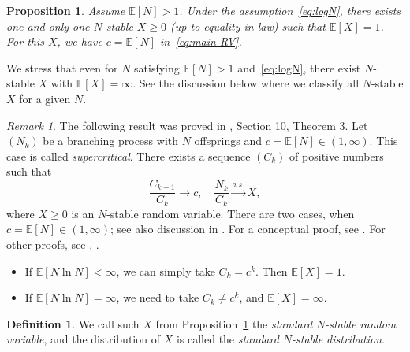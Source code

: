 \documentclass[12pt]{amsart}
\newtheorem{prop}{Proposition}[section]
\theoremstyle{remark}
\newtheorem{remark}{Remark}[section]
\theoremstyle{definition}
\newtheorem{definition}{Definition}[section]
\begin{document}
\begin{prop} 
Assume $\mathbb E[N] > 1$. Under the assumption~\eqref{eq:logN}, there exists one and only one $N$-stable $X \ge 0$ (up to equality in law) such that $\mathbb E[X] = 1$. For this $X$, we have $c = \mathbb E[N]$ in~\eqref{eq:main-RV}. 
\label{prop:n-ln-n}
\end{prop}

We stress that even for $N$ satisfying $\mathbb E[N] > 1$ and~\eqref{eq:logN}, there exist $N$-stable $X$ with $\mathbb E[X] = \infty$. See the discussion below where we classify all $N$-stable $X$ for a given $N$. 

\begin{remark}
The following result was proved in \cite[Chapter I]{AthreyaBook}, Section 10, Theorem 3. Let $(N_k)$ be a branching process with $N$ offsprings and $c = \mathbb E[N] \in (1, \infty)$. This case is called {\it supercritical}. There exists a sequence $(C_k)$ of positive numbers such that 
\begin{equation}
\label{eq:conv}
\frac{C_{k+1}}{C_k} \to c,\quad \frac{N_k}{C_k} \stackrel{a.s.}{\to} X,
\end{equation}
where $X \ge 0$ is an $N$-stable random variable. There are two cases, when $c = \mathbb E[N] \in (1, \infty)$; see also discussion in \cite{Bingham1988}. For a conceptual proof, see \cite{Concept}. For other proofs, see \cite[Theorem 3.1]{Seneta1968},   \cite[Theorem 4.3]{Seneta1969}.
\begin{itemize}
\item If $\mathbb E[N\ln N] < \infty$, we can simply take $C_k = c^k$. Then $\mathbb E[X] = 1$.
\item If $\mathbb E[N\ln N] = \infty$, we need to take $C_k \ne c^k$, and $\mathbb E[X] = \infty$. 
\end{itemize}  
\label{rmk:conv}
\end{remark}

\begin{definition} We call such $X$ from Proposition~\ref{prop:n-ln-n} the {\it standard $N$-stable random variable}, and the distribution of $X$ is called the {\it standard $N$-stable distribution}. 
\end{definition}
\end{document}
